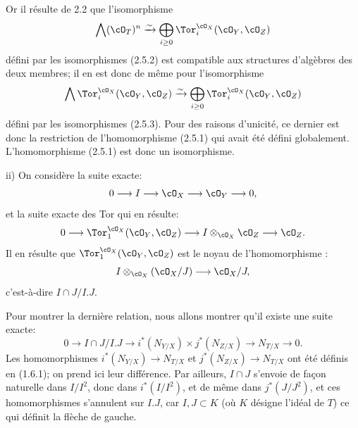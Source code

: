 Or il
résulte de 2.2 que l'isomorphisme
\[
\bigwedge(\cO_T)^n\xrightarrow{\sim}
\bigoplus_{i\ge0}\Tor_i^{\cO_X}(\cO_Y,\cO_Z)
\]
défini par les isomorphismes (2.5.2) est compatible aux structures d'algèbres des deux membres; il en est donc de même pour l'isomorphisme
\[
\bigwedge\Tor_i^{\cO_X}(\cO_Y,\cO_Z)\xrightarrow{\sim}
\bigoplus_{i\ge0}\Tor_i^{\cO_X}(\cO_Y,\cO_Z)
\]
défini par les isomorphismes (2.5.3). Pour des raisons d'unicité, ce dernier est donc la restriction de l'homomorphisme (2.5.1) qui avait été défini globalement. L'homomorphisme (2.5.1) est donc un isomorphisme.

ii) On considère la suite exacte:
\[
0\longrightarrow I\longrightarrow \cO_X\longrightarrow \cO_Y\longrightarrow0,
\]
et la suite exacte des Tor qui en résulte:
\[
0\longrightarrow\Tor_1^{\cO_X}(\cO_Y,\cO_Z)
\longrightarrow I\otimes_{\cO_X}\cO_Z
\longrightarrow \cO_Z.
\]
Il en résulte que \(\Tor_1^{\cO_X}(\cO_Y,\cO_Z)\) est le noyau de l'homomorphisme :
\[
I\otimes_{\cO_X}(\cO_X/J)\longrightarrow \cO_X/J,
\]
c'est-à-dire \(I\cap J/I.J\).

Pour montrer la dernière relation, nous allons montrer qu'il existe une suite exacte:
\[
0\longrightarrow I\cap J/I.J
\longrightarrow i^*(N_{Y/X})\times j^*(N_{Z/X})
\longrightarrow N_{T/X}\longrightarrow0.
\]
Les homomorphismes \(i^*(N_{Y/X})\to N_{T/X}\) et \(j^*(N_{Z/X})\to N_{T/X}\) ont été définis en (1.6.1); on prend ici leur différence. Par ailleurs, \(I\cap J\) s'envoie de façon naturelle dans \(I/I^2\), donc dans \(i^*(I/I^2)\), et de même dans \(j^*(J/J^2)\), et ces homomorphismes s'annulent sur \(I.J\), car \(I,J\subset K\) (où \(K\) désigne l'idéal de \(T\)) ce qui définit la flèche de gauche.

